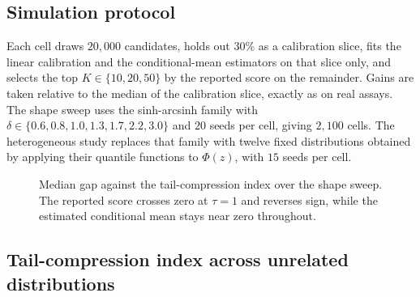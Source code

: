 \documentclass{article}
\theoremstyle{plain}
\theoremstyle{definition}
\begin{document}
\subsection{Simulation protocol}
\label{app:sim-protocol}

Each cell draws $20{,}000$ candidates, holds out $30\%$ as a calibration slice, fits
the linear calibration and the conditional-mean estimators on that slice only, and
selects the top $K \in \{10, 20, 50\}$ by the reported score on the remainder. Gains
are taken relative to the median of the calibration slice, exactly as on real assays.
The shape sweep uses the sinh-arcsinh family with $\delta \in \{0.6, 0.8, 1.0, 1.3,
1.7, 2.2, 3.0\}$ and $20$ seeds per cell, giving $2{,}100$ cells. The heterogeneous
study replaces that family with twelve fixed distributions obtained by applying their
quantile functions to $\Phi(z)$, with $15$ seeds per cell.

\begin{figure}[ht]
\vskip 0.1in
\begin{center}
\end{center}
\caption{Median gap against the tail-compression index over the shape sweep. The
reported score crosses zero at $\tau = 1$ and reverses sign, while the estimated
conditional mean stays near zero throughout.}
\label{fig:synth}
\vskip -0.15in
\end{figure}

\subsection{Tail-compression index across unrelated distributions}
\label{app:shapes}
\end{document}
